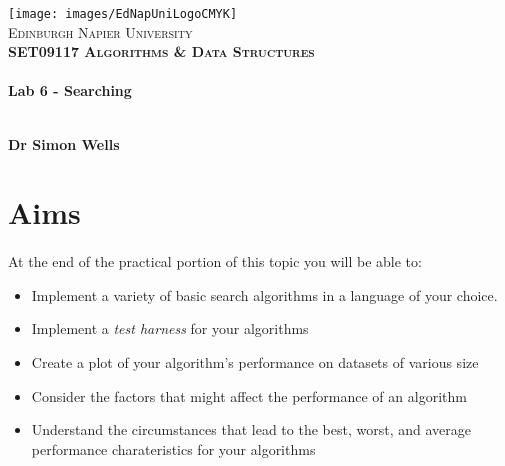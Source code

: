 \documentclass[10pt, a4paper, twosize]{article}
\begin{document}

\begin{titlepage}
\vspace*{5cm}
\begin{center}
\texttt{[image: images/EdNapUniLogoCMYK]}~\\[1cm]

\textsc{\Large Edinburgh Napier University}\\[1.5cm]

\textsc{\LARGE \bfseries SET09117 Algorithms \& Data Structures}\\[0.5cm]

\hrulefill \\[0.4cm]
{\huge \bfseries Lab 6 - Searching \\[0.4cm] }
\hrulefill \\[1.5cm]

\begin{minipage}{0.4\textwidth}
\begin{flushleft} \large
\textbf{Dr Simon Wells} \\
\end{flushleft}
\end{minipage}

\vfill

\end{center}
\end{titlepage}




%

\section{Aims}
\paragraph{} At the end of the practical portion of this topic you will be able to:

\begin{itemize}
\item Implement a variety of basic search algorithms in a language of your choice.
\item Implement a \emph{test harness} for your algorithms
\item Create a plot of your algorithm's performance on datasets of various size
\item Consider the factors that might affect the performance of an algorithm
\item Understand the circumstances that lead to the best, worst, and average performance charateristics for your algorithms
\end{itemize}
\end{document}
